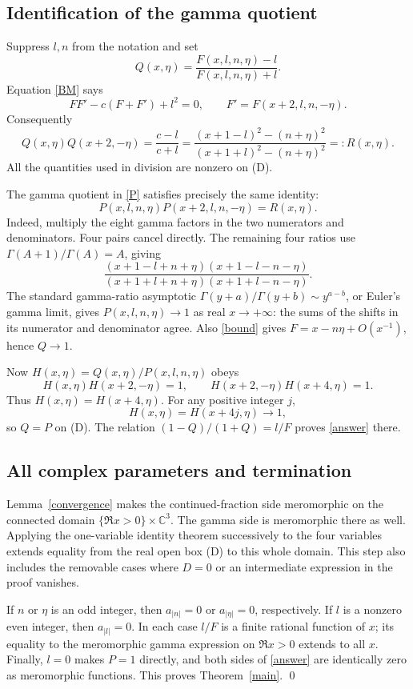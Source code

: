 \documentclass[11pt]{article}
\begin{document}
\subsection*{Identification of the gamma quotient}
Suppress \(l,n\) from the notation and set
\[
 Q(x,\eta)=\frac{F(x,l,n,\eta)-l}{F(x,l,n,\eta)+l}.
\]
Equation \eqref{BM} says
\[
 FF'-c(F+F')+l^2=0,\qquad F'=F(x+2,l,n,-\eta).
\]
Consequently
\begin{equation}
 Q(x,\eta)Q(x+2,-\eta)
 =\frac{c-l}{c+l}
 =\frac{(x+1-l)^2-(n+\eta)^2}
        {(x+1+l)^2-(n+\eta)^2}
 =:R(x,\eta).
\label{Qrec}
\end{equation}
All the quantities used in division are nonzero on (D).

The gamma quotient in \eqref{P} satisfies precisely the same identity:
\begin{equation}
 P(x,l,n,\eta)P(x+2,l,n,-\eta)=R(x,\eta).
\label{Prec}
\end{equation}
Indeed, multiply the eight gamma factors in the two numerators and
denominators. Four pairs cancel directly. The remaining four ratios use
\(\Gamma(A+1)/\Gamma(A)=A\), giving
\[
 \frac{(x+1-l+n+\eta)(x+1-l-n-\eta)}
      {(x+1+l+n+\eta)(x+1+l-n-\eta)}.
\]
The standard gamma-ratio asymptotic
\(\Gamma(y+a)/\Gamma(y+b)\sim y^{a-b}\), or Euler's gamma limit,
gives \(P(x,l,n,\eta)\to1\) as real \(x\to+\infty\):
the sums of the shifts in its numerator and denominator agree.
Also \eqref{bound} gives \(F=x-n\eta+O(x^{-1})\), hence \(Q\to1\).

Now \(H(x,\eta)=Q(x,\eta)/P(x,l,n,\eta)\) obeys
\[
 H(x,\eta)H(x+2,-\eta)=1,\qquad
 H(x+2,-\eta)H(x+4,\eta)=1.
\]
Thus \(H(x,\eta)=H(x+4,\eta)\). For any positive integer \(j\),
\[
 H(x,\eta)=H(x+4j,\eta)\longrightarrow1,
\]
so \(Q=P\) on (D). The relation
\((1-Q)/(1+Q)=l/F\) proves \eqref{answer} there.

\subsection*{All complex parameters and termination}
Lemma~\ref{convergence} makes the continued-fraction side meromorphic
on the connected domain
\(\{\Re x>0\}\times\mathbb C^3\). The gamma side is meromorphic there
as well. Applying the one-variable identity theorem successively
to the four variables extends equality from the real open box (D)
to this whole domain. This step also includes the removable cases
where \(D=0\) or an intermediate expression in the proof vanishes.

If \(n\) or \(\eta\) is an odd integer, then \(a_{|n|}=0\) or
\(a_{|\eta|}=0\), respectively. If \(l\) is a nonzero even integer,
then \(a_{|l|}=0\). In each case \(l/F\) is a finite rational
function of \(x\); its equality to the meromorphic gamma expression
on \(\Re x>0\) extends to all \(x\). Finally, \(l=0\) makes
\(P=1\) directly, and both sides of \eqref{answer} are identically
zero as meromorphic functions. This proves Theorem~\ref{main}.
\qed
\end{document}
